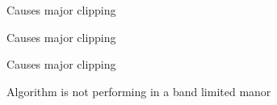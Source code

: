 
\begin{DoxyRefList}
\item[\label{bug__bug000001}%
\hypertarget{bug__bug000001}{}%
Class \hyperlink{class_d_s_g_1_1_d_p_w_1_1_d_p_w___differentiator_3_014_01_4}{D\+S\+G\+:\+:D\+P\+W\+:\+:D\+P\+W\+\_\+\+Differentiator$<$ 4 $>$} ]Causes major clipping  
\item[\label{bug__bug000002}%
\hypertarget{bug__bug000002}{}%
Class \hyperlink{class_d_s_g_1_1_d_p_w_1_1_d_p_w___differentiator_3_015_01_4}{D\+S\+G\+:\+:D\+P\+W\+:\+:D\+P\+W\+\_\+\+Differentiator$<$ 5 $>$} ]Causes major clipping  
\item[\label{bug__bug000003}%
\hypertarget{bug__bug000003}{}%
Class \hyperlink{class_d_s_g_1_1_d_p_w_1_1_d_p_w___differentiator_3_016_01_4}{D\+S\+G\+:\+:D\+P\+W\+:\+:D\+P\+W\+\_\+\+Differentiator$<$ 6 $>$} ]Causes major clipping  
\item[\label{bug__bug000004}%
\hypertarget{bug__bug000004}{}%
Class \hyperlink{class_d_s_g_1_1_e_p_t_r_1_1_e_p_t_r_saw}{D\+S\+G\+:\+:E\+P\+T\+R\+:\+:E\+P\+T\+R\+Saw} ]Algorithm is not performing in a band limited manor 
\end{DoxyRefList}